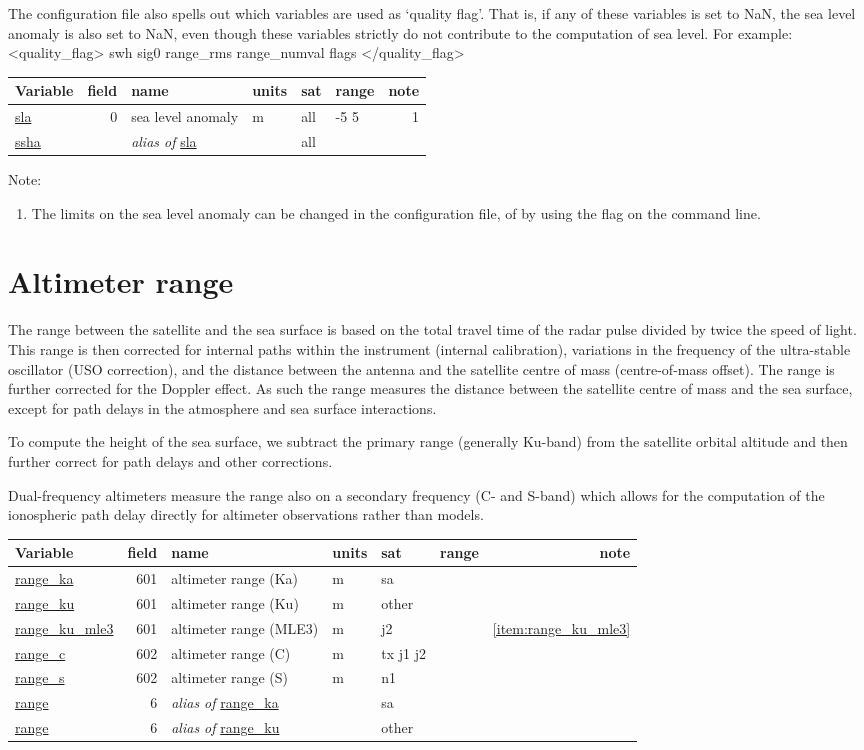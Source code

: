 \documentclass[a4paper,11pt,openany,natbib]{thesis}
\makeatletter
\newcommand\var[1]{\url{#1}\index{variables!#1@\protect\url{#1}}}
\newcommand\alias[1]{\emph{alias of} \var{#1}}
\newenvironment{vartable}{
\begin{table}[ht]
\small
\begin{tabular}{lrllllr}
\hline
Variable & field & name & units & sat & range & note \\
\hline
}{
\hline
\end{tabular}
\end{table}
}
\newenvironment{smallverb}{\small\verbatim}{\endverbatim}
\makeatother
\begin{document}
The configuration file also spells out which variables are used as `quality flag'. That is, if any of these variables is set to NaN, the sea level anomaly is also set to NaN, even though these variables strictly do not contribute to the computation of sea level. For example:
\begin{smallverb}
<quality_flag>
    swh sig0 range_rms range_numval flags
</quality_flag>
\end{smallverb} 
\begin{vartable}
\var{sla} & 0 & sea level anomaly & m & all & -5 5 & 1 \\
\hline
\var{ssha} & & \alias{sla} & & all & & \\
\end{vartable}

Note:
\begin{enumerate}
\item The limits on the sea level anomaly can be changed in the configuration file, of by using the  flag on the command line.
\end{enumerate}

\section{Altimeter range}
\label{var:range}
The range between the satellite and the sea surface is based on the total travel time of the radar pulse divided by twice the speed of light. This range is then corrected for internal paths within the instrument (internal calibration), variations in the frequency of the ultra-stable oscillator (USO correction), and the distance between the antenna and the satellite centre of mass (centre-of-mass offset). The range is further corrected for the Doppler effect. As such the range measures the distance between the satellite centre of mass and the sea surface, except for path delays in the atmosphere and sea surface interactions.

To compute the height of the sea surface, we subtract the primary range (generally Ku-band) from the satellite orbital altitude and then further correct for path delays and other corrections.

Dual-frequency altimeters measure the range also on a secondary frequency (C- and S-band) which allows for the computation of the ionospheric path delay directly for altimeter observations rather than models.

\begin{vartable}
\var{range_ka} & 601 & altimeter range (Ka) & m & sa & & \\
\var{range_ku} & 601 & altimeter range (Ku) & m & other & & \\
\var{range_ku_mle3} & 601 & altimeter range (MLE3) & m & j2 & & \ref{item:range_ku_mle3} \\
\var{range_c}  & 602 & altimeter range (C) & m & tx j1 j2 & & \\
\var{range_s}  & 602 & altimeter range (S) & m & n1 & & \\
\hline
\var{range} & 6 & \alias{range_ka} & & sa & & \\
\var{range} & 6 & \alias{range_ku} & & other & & \\
\end{vartable}
\end{document}
